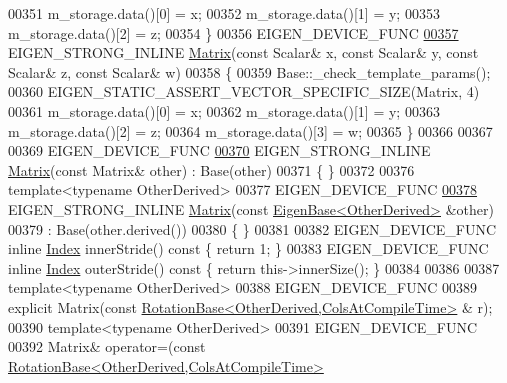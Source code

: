 \begin{DoxyCode}
00351       m\_storage.data()[0] = x;
00352       m\_storage.data()[1] = y;
00353       m\_storage.data()[2] = z;
00354     \}
00356     EIGEN\_DEVICE\_FUNC
\hyperlink{group___core___module_afe8c7913883c78db58f15e22103f93a2}{00357}     EIGEN\_STRONG\_INLINE \hyperlink{group___core___module_afe8c7913883c78db58f15e22103f93a2}{Matrix}(\textcolor{keyword}{const} Scalar& x, \textcolor{keyword}{const} Scalar& y, \textcolor{keyword}{const} Scalar& z, \textcolor{keyword}{const} Scalar& w)
00358     \{
00359       Base::\_check\_template\_params();
00360       EIGEN\_STATIC\_ASSERT\_VECTOR\_SPECIFIC\_SIZE(Matrix, 4)
00361       m\_storage.data()[0] = x;
00362       m\_storage.data()[1] = y;
00363       m\_storage.data()[2] = z;
00364       m\_storage.data()[3] = w;
00365     \}
00366 
00367 
00369     EIGEN\_DEVICE\_FUNC
\hyperlink{group___core___module_aea16cba266274974c729c98e8567f41d}{00370}     EIGEN\_STRONG\_INLINE \hyperlink{group___core___module_aea16cba266274974c729c98e8567f41d}{Matrix}(\textcolor{keyword}{const} Matrix& other) : Base(other)
00371     \{ \}
00372 
00376     \textcolor{keyword}{template}<\textcolor{keyword}{typename} OtherDerived>
00377     EIGEN\_DEVICE\_FUNC
\hyperlink{group___core___module_ae4bcda7578de9624709cbfa8d3ddd9d9}{00378}     EIGEN\_STRONG\_INLINE \hyperlink{group___core___module_ae4bcda7578de9624709cbfa8d3ddd9d9}{Matrix}(\textcolor{keyword}{const} \hyperlink{group___core___module_struct_eigen_1_1_eigen_base}{EigenBase<OtherDerived>} &other)
00379       : Base(other.derived())
00380     \{ \}
00381 
00382     EIGEN\_DEVICE\_FUNC \textcolor{keyword}{inline} \hyperlink{namespace_eigen_a62e77e0933482dafde8fe197d9a2cfde}{Index} innerStride()\textcolor{keyword}{ const }\{ \textcolor{keywordflow}{return} 1; \}
00383     EIGEN\_DEVICE\_FUNC \textcolor{keyword}{inline} \hyperlink{namespace_eigen_a62e77e0933482dafde8fe197d9a2cfde}{Index} outerStride()\textcolor{keyword}{ const }\{ \textcolor{keywordflow}{return} this->innerSize(); \}
00384 
00386 
00387     \textcolor{keyword}{template}<\textcolor{keyword}{typename} OtherDerived>
00388     EIGEN\_DEVICE\_FUNC
00389     \textcolor{keyword}{explicit} Matrix(\textcolor{keyword}{const} \hyperlink{class_eigen_1_1_rotation_base}{RotationBase<OtherDerived,ColsAtCompileTime>}
      & r);
00390     \textcolor{keyword}{template}<\textcolor{keyword}{typename} OtherDerived>
00391     EIGEN\_DEVICE\_FUNC
00392     Matrix& operator=(\textcolor{keyword}{const} \hyperlink{class_eigen_1_1_rotation_base}{RotationBase<OtherDerived,ColsAtCompileTime>}

\end{DoxyCode}
